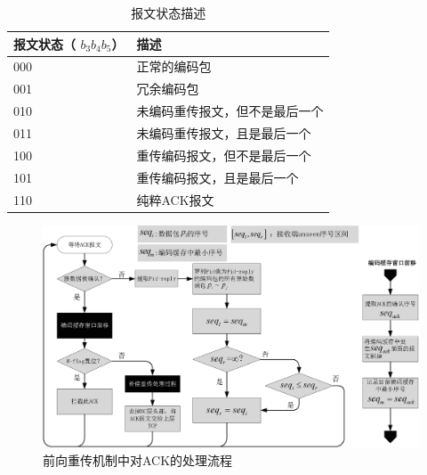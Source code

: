 \begin{table}[htp]
	\centering
	\caption{报文状态描述}
	\label{tab:BWZT}
	\begin{tabular}{l|l}
		\toprule
		报文状态（ $b_3b_4b_5$） &描述\tabularnewline
		\midrule
		000		& 正常的编码包\tabularnewline
		001		& 冗余编码包 \tabularnewline
		010		& 未编码重传报文，但不是最后一个\tabularnewline
		011 	& 未编码重传报文，且是最后一个\tabularnewline
		100		& 重传编码报文，但不是最后一个\tabularnewline
		101		& 重传编码报文，且是最后一个\tabularnewline
		110		& 纯粹ACK报文\tabularnewline
		\bottomrule
	\end{tabular}
\end{table}
\begin{figure}[htbp]
	\centering
	\includegraphics[width=6in]{figures/fr-rcvack.eps}
	\caption{前向重传机制中对ACK的处理流程}
	\label{RCVACK_EPS}
\end{figure}
